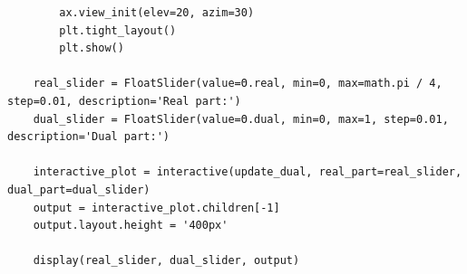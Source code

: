 \begin{verbatim}
        ax.view_init(elev=20, azim=30)
        plt.tight_layout()
        plt.show()

    real_slider = FloatSlider(value=Θ.real, min=0, max=math.pi / 4, step=0.01, description='Real part:')
    dual_slider = FloatSlider(value=Θ.dual, min=0, max=1, step=0.01, description='Dual part:')

    interactive_plot = interactive(update_dual, real_part=real_slider, dual_part=dual_slider)
    output = interactive_plot.children[-1]
    output.layout.height = '400px'

    display(real_slider, dual_slider, output)
\end{verbatim}
